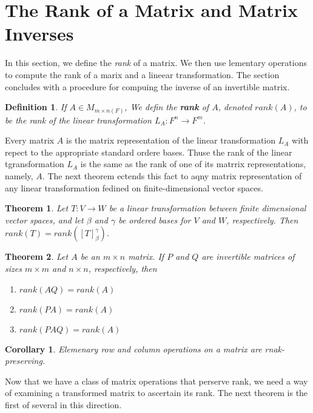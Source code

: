 \documentclass[10pt, oneside]{article}
\newtheorem{thm}{Theorem}
\newtheorem{defn}{Definition}
\newtheorem{cor}{Corollary}
\begin{document}
\section{The Rank of a Matrix and Matrix Inverses}

In this section, we define the \textit{rank} of a matrix. We then use lementary operations to compute the rank of a marix and a lineear transformation. The section concludes with
a procedure for compuing the inverse of an invertible matrix.

\begin{defn}
	If $A \in M_{m \times n(F)}$, We defin the \textbf{rank} of $A$, denoted $rank(A)$, to be the rank of the linear transformation $L_A: F^n \to F^m$.
\end{defn}

Every matrix $A$ is the matrix representation of the linear transformation $L_A$ with repect to the appropriate standard ordere bases. Thuse the rank of the linear tgransformation $L_A$
is the same as the rank of one of its matrrix representations, namely, $A$. The next theorem ectends this fact to aqny matrix representation of any linear transformation fedined on finite-dimensional
vector spaces.

\begin{thm}
	Let $T:V \to W$ be a linear transformation between finite dimensional vector spaces, and let $\beta$ and $\gamma$ be ordered bases for $V$ and $W$, respectively.
	Then $rank(T) = rank([T]_{\beta}^{\gamma})$.
\end{thm}

\begin{thm}
	Let $A$ be an $m \times n$ matrix. If $P$ and $Q$ are invertible matrices of sizes $m \times m$ and $n \times n$, respectively, then
	\begin{enumerate}
		\item $rank(AQ) = rank(A)$
		\item $rank(PA) = rank(A)$
		\item $rank(PAQ) = rank(A)$
	\end{enumerate}
\end{thm}

\begin{cor}
	Elemenary row and column operations on a matrix are rnak-preserving.
\end{cor}

Now that we have a class of matrix operations that perserve rank, we need a way of examining a transformed matrix to ascertain its rank. The next theorem
is the first of several in this direction.
\end{document}
